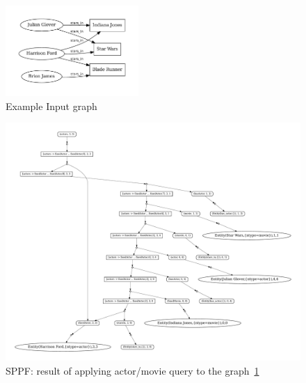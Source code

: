 \begin{figure}[h]
\includegraphics[width=0.45\textwidth]{graph}

\caption{Example Input graph}
\label{fig:graph}
\end{figure}

\begin{figure}[h]
\includegraphics[scale=0.5]{sppf}
\caption{SPPF: result of applying actor/movie query to the graph~\ref{fig:graph}}
\label{fig:sppf}
\end{figure}
